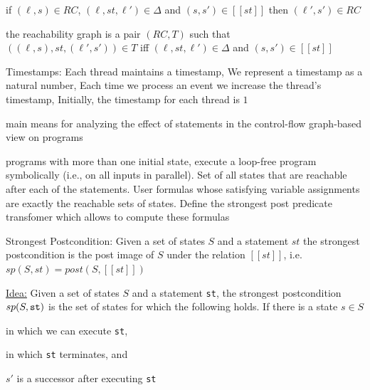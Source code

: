 \documentclass[landscape, a4paper]{article}
\begin{document}
\begin{minipage}[t]{0.2\linewidth}
\begin{betterlist}
\begin{betterlist}
			\item if $(\ell, s) \in RC$, $(\ell, st, \ell') \in \Delta$ and $(s, s') \in [[st]]$ then $(\ell', s') \in RC$
		\end{betterlist}
		\item \color{orange}the \alert{reachability graph} is a pair $(RC, T)$ such that $((\ell, s), st, (\ell', s')) \in T$ iff $(\ell, st, \ell') \in \Delta$ and $(s, s') \in [[st]]$\color{black}
		\item \alert{Timestamps:} Each thread maintains a timestamp, We represent a timestamp as a natural number, Each time we process an event we increase the thread’s timestamp, Initially, the timestamp for each thread is $1$
		\begin{betterlist}
			\item {}
			\item {}
		\end{betterlist}
	\end{betterlist}
	\fbox{Predicate Transformers}
	\begin{betterlist}
		\item main means for analyzing the effect of statements in the control-flow graph-based view on programs
		\item programs with more than one initial state, execute a loop-free program symbolically (i.e., on all inputs in parallel). Set of all states that are reachable after each of the statements. User formulas whose satisfying variable assignments are exactly the reachable sets of states. Define the \alert{strongest post predicate transfomer} which allows to compute these formulas
		\item \color{orange}\alert{Strongest Postcondition:} Given a set of states $S$ and a statement $st$ the strongest postcondition is the post image of $S$ under the relation $[[st]]$, i.e. $sp(S, st) = post(S, [[st]])$
		\begin{betterlist}
			\item \underline{Idea:} Given a set of states $S$ and a statement \verb|st|, the strongest postcondition $sp(S, \verb|st|)$ is the set of states for which the following holds. If there is a state $s \in S$
			\begin{betterlist}
				\item in which we can execute \verb|st|,
				\item in which \verb|st| terminates, and
				\item $s'$ is a successor after executing \verb|st|
			\end{betterlist}

\end{betterlist}
\end{betterlist}
\end{minipage}
\end{document}
